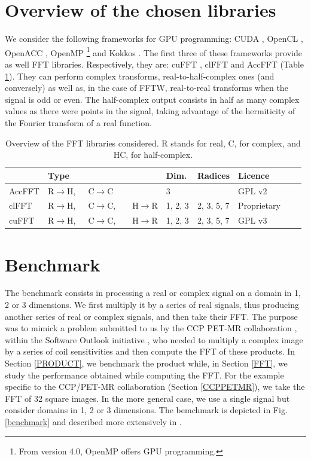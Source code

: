 \documentclass[12pt, a4paper]{article}
\begin{document}
\section{Overview of the chosen libraries}
We consider the following frameworks for GPU programming: CUDA \cite{cuda}, OpenCL \cite{opencl}, \mbox{OpenACC} \cite{openacc}, OpenMP \cite{openmp}\footnote{From version 4.0, OpenMP offers GPU programming.} and Kokkos \cite{kokkos}. The first three of these frameworks provide as well FFT libraries. Respectively, they are: cuFFT \cite{cufft}, clFFT \cite{clfft} and AccFFT \cite{accfft} (Table \ref{ffttable}). They can perform complex transforms, real-to-half-complex ones (and conversely) as well as, in the case of FFTW, real-to-real transforms when the signal is odd or even. The half-complex output consists in half as many complex values as there were points in the signal, taking advantage of the hermiticity of the Fourier transform of a real function.\\
\begin{table}[H]
\captionsetup{width=0.8\textwidth}
\centering
\begin{tabular}{|p{2.5cm}||p{2.5cm}|p{1cm}|p{3cm}|p{3cm}|p{2cm}|p{2cm}|}
\hline
& Type & Dim. & Radices & Licence \\
\hline
\hline
AccFFT & R$\to$H,\ \ \  C$\to$C& 3& & GPL v2\\
\hline
clFFT  &  R$\to$H,\ \ \  C$\to$C,\ \ \ \  H$\to$R& 1, 2, 3 & 2, 3, 5, 7 & Proprietary\\
\hline
cuFFT  &  R$\to$H,\ \ \  C$\to$C,\ \ \ \  H$\to$R & 1, 2, 3 & 2, 3, 5, 7 & GPL v3\\
\hline
\end{tabular}
\caption{Overview of the FFT libraries considered. R stands for real, C, for complex, and HC, for half-complex.}
\label{ffttable}
\end{table}
\section{Benchmark}
The benchmark \cite{code} consists in processing a real or complex signal on a domain in 1, 2 or 3 dimensions. We first multiply it by a series of real signals, thus producing another series of real or complex signals, and then take their FFT.  The purpose was to mimick a problem submitted to us by the CCP PET-MR collaboration \cite{ccppetmr}, within the Software Outlook initiative \cite{softwareoutlook}, who needed to multiply a complex image by a series of coil sensitivities and then compute the FFT of these products. In Section \ref{PRODUCT}, we benchmark the product while, in Section \ref{FFT}, we study the performance obtained while computing the FFT. For the example specific to the CCP/PET-MR collaboration (Section \ref{CCPPETMR}), we take the FFT of 32 square images. In the more general case, we use a single signal but consider domains in 1, 2 or 3 dimensions. The bemchmark is depicted in Fig. \ref{benchmark} and described more extensively in \cite{FFTREPORT}.\\
\end{document}
